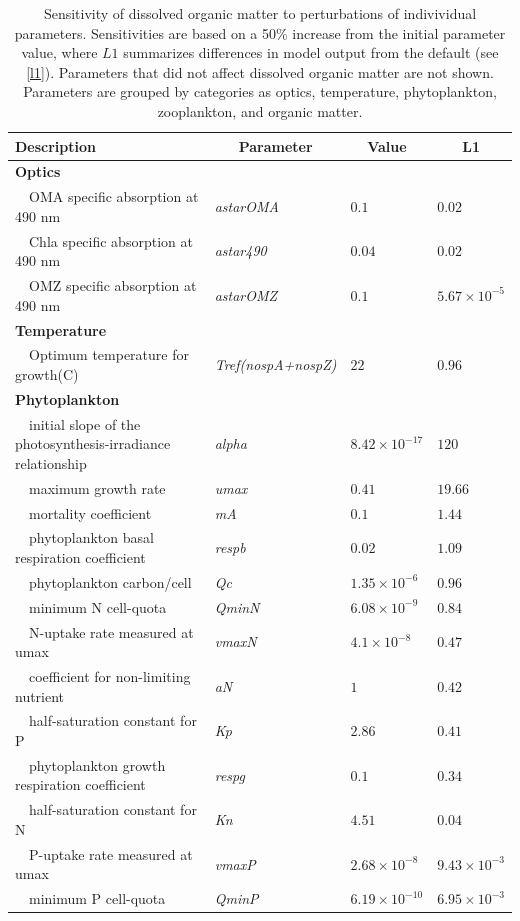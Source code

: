 \documentclass[letterpaper,12pt,oneside]{article}\usepackage[]{graphicx}\usepackage[]{color}
\begin{document}
\begin{table}[!tbp]
{\footnotesize
\caption{Sensitivity of dissolved organic matter to perturbations of indivividual parameters.  Sensitivities are based on a 50\% increase from the initial parameter value, where $L1$ summarizes differences in model output from the default (see \cref{l1}).  Parameters that did not affect dissolved organic matter are not shown.  Parameters are grouped by categories as optics, temperature, phytoplankton, zooplankton, and organic matter.\label{tab:om2sens}} 
\begin{center}
\begin{tabular}{llll}
\hline\hline
\multicolumn{1}{l}{Description}&\multicolumn{1}{c}{Parameter}&\multicolumn{1}{c}{Value}&\multicolumn{1}{c}{L1}\tabularnewline
\hline
{\bfseries Optics}&&&\tabularnewline
~~OMA specific absorption at 490 nm&\textit{astarOMA}&$0.1$&$0.02$\tabularnewline
~~Chla specific absorption at 490 nm&\textit{astar490}&$0.04$&$0.02$\tabularnewline
~~OMZ specific absorption at 490 nm&\textit{astarOMZ}&$0.1$&$5.67\times 10^{-5}$\tabularnewline
\hline
{\bfseries Temperature}&&&\tabularnewline
~~Optimum temperature for growth(C)&\textit{Tref(nospA+nospZ)}&$22$&$0.96$\tabularnewline
\hline
{\bfseries Phytoplankton}&&&\tabularnewline
~~initial slope of the photosynthesis-irradiance relationship&\textit{alpha}&$8.42\times 10^{-17}$&$120$\tabularnewline
~~maximum growth rate&\textit{umax}&$0.41$&$19.66$\tabularnewline
~~mortality coefficient&\textit{mA}&$0.1$&$1.44$\tabularnewline
~~phytoplankton basal respiration coefficient&\textit{respb}&$0.02$&$1.09$\tabularnewline
~~phytoplankton carbon/cell&\textit{Qc}&$1.35\times 10^{-6}$&$0.96$\tabularnewline
~~minimum N cell-quota&\textit{QminN}&$6.08\times 10^{-9}$&$0.84$\tabularnewline
~~N-uptake rate measured at umax&\textit{vmaxN}&$4.1\times 10^{-8}$&$0.47$\tabularnewline
~~coefficient for non-limiting nutrient&\textit{aN}&$1$&$0.42$\tabularnewline
~~half-saturation constant for P&\textit{Kp}&$2.86$&$0.41$\tabularnewline
~~phytoplankton growth respiration coefficient&\textit{respg}&$0.1$&$0.34$\tabularnewline
~~half-saturation constant for N&\textit{Kn}&$4.51$&$0.04$\tabularnewline
~~P-uptake rate measured at umax&\textit{vmaxP}&$2.68\times 10^{-8}$&$9.43\times 10^{-3}$\tabularnewline
~~minimum P cell-quota&\textit{QminP}&$6.19\times 10^{-10}$&$6.95\times 10^{-3}$\tabularnewline

\end{tabular}
\end{center}}
\end{table}
\end{document}
